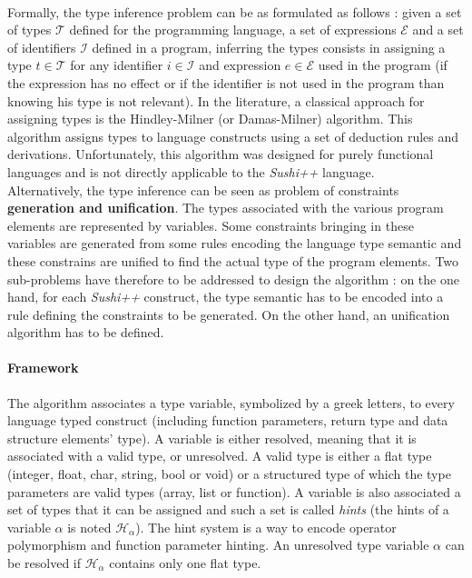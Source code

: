 \documentclass[a4paper,11pt]{article}
\begin{document}
\paragraph{}
Formally, the type inference problem can be as formulated as follows : given a set of types $\mathcal{T}$ defined for the programming language, a set of expressions $\mathcal{E}$ and a set of identifiers $\mathcal{I}$ defined in a program, inferring the types consists in assigning a type $t \in \mathcal{T}$ for any identifier $i \in \mathcal{I}$ and expression $e \in \mathcal{E}$ used in the program (if the expression has no effect or if the identifier is not used in the program than knowing his type is not relevant). In the literature, a classical approach for assigning types is the Hindley-Milner (or Damas-Milner) algorithm. This algorithm assigns types to language constructs using a set of deduction rules and derivations. Unfortunately, this algorithm was designed for purely functional languages and is not directly applicable to the \textit{Sushi++} language. \\
Alternatively, the type inference can be seen as problem of constraints \textbf{generation and unification}. The types associated with the various program elements are represented by variables. Some constraints bringing in these variables are generated from some rules encoding the language type semantic and these constrains are unified to find the actual type of the program elements. Two sub-problems have therefore to be addressed to design the algorithm : on the one hand, for each \textit{Sushi++} construct, the type semantic has to be encoded into a rule defining the constraints to be generated. On the other hand, an unification algorithm has to be defined.
\paragraph{Framework} The algorithm associates a type variable, symbolized by a greek letters, to every language typed construct (including function parameters, return type and data structure elements' type). A variable is either resolved, meaning that it is associated with a valid type, or unresolved. A valid type is either a flat type (integer, float, char, string, bool or void) or a structured type of which the type parameters are valid types (array, list or function). A variable is also associated a set of types that it can be assigned and such a set is called \textit{hints} (the hints of a variable $\alpha$ is noted $\mathcal{H}_\alpha$). The hint system is a way to encode operator polymorphism and function parameter hinting. An unresolved type variable $\alpha$ can be resolved if $\mathcal{H}_\alpha$ contains only one flat type. 
\end{document}
